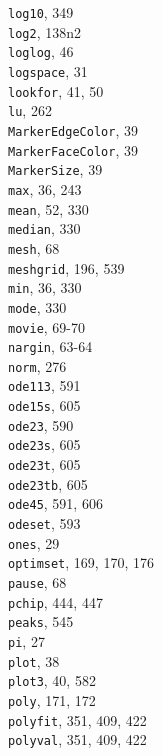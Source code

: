 \documentclass[../main.tex]{subfiles}
\begin{document}
\begin{multicols}{3}
    \texttt{log10}, 349\\
    \texttt{log2}, 138n2\\
    \texttt{loglog}, 46\\
    \texttt{logspace}, 31\\
    \texttt{lookfor}, 41, 50\\
    \texttt{lu}, 262\\
    \texttt{MarkerEdgeColor}, 39\\
    \texttt{MarkerFaceColor}, 39\\
    \texttt{MarkerSize}, 39\\
    \texttt{max}, 36, 243\\
    \texttt{mean}, 52, 330\\
    \texttt{median}, 330\\
    \texttt{mesh}, 68\\
    \texttt{meshgrid}, 196, 539\\
    \texttt{min}, 36, 330\\
    \texttt{mode}, 330\\
    \texttt{movie}, 69-70\\
    \texttt{nargin}, 63-64\\
    \texttt{norm}, 276\\
    \texttt{ode113}, 591\\
    \texttt{ode15s}, 605\\
    \texttt{ode23}, 590\\
    \texttt{ode23s}, 605\\
    \texttt{ode23t}, 605\\
    \texttt{ode23tb}, 605\\
    \texttt{ode45}, 591, 606\\
    \texttt{odeset}, 593\\
    \texttt{ones}, 29\\
    \texttt{optimset}, 169, 170, 176\\
    \texttt{pause}, 68\\
    \texttt{pchip}, 444, 447\\
    \texttt{peaks}, 545\\
    \texttt{pi}, 27\\
    \texttt{plot}, 38\\
    \texttt{plot3}, 40, 582\\
    \texttt{poly}, 171, 172\\
    \texttt{polyfit}, 351, 409, 422\\
    \texttt{polyval}, 351, 409, 422\\

\end{multicols}
\end{document}
